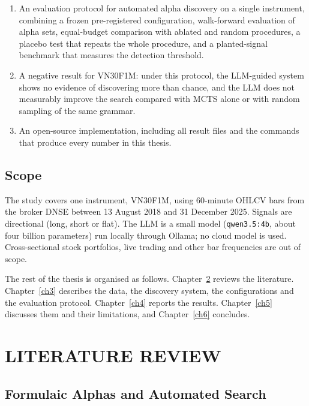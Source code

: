 \documentclass[12pt,a4paper,oneside]{book}
\theoremstyle{definition}
\newcommand{\code}[1]{\texttt{#1}}
\begin{document}
\begin{enumerate}
  \item An evaluation protocol for automated alpha discovery on a single instrument, combining a frozen pre-registered configuration, walk-forward evaluation of alpha sets, equal-budget comparison with ablated and random procedures, a placebo test that repeats the whole procedure, and a planted-signal benchmark that measures the detection threshold.
  \item A negative result for VN30F1M: under this protocol, the LLM-guided system shows no evidence of discovering more than chance, and the LLM does not measurably improve the search compared with MCTS alone or with random sampling of the same grammar.
  \item An open-source implementation, including all result files and the commands that produce every number in this thesis.
\end{enumerate}

\section{Scope}

The study covers one instrument, VN30F1M, using 60-minute OHLCV bars from the broker DNSE between 13 August 2018 and 31 December 2025. Signals are directional (long, short or flat). The LLM is a small model (\code{qwen3.5:4b}, about four billion parameters) run locally through Ollama; no cloud model is used. Cross-sectional stock portfolios, live trading and other bar frequencies are out of scope.

The rest of the thesis is organised as follows. Chapter~\ref{ch2} reviews the literature. Chapter~\ref{ch3} describes the data, the discovery system, the configurations and the evaluation protocol. Chapter~\ref{ch4} reports the results. Chapter~\ref{ch5} discusses them and their limitations, and Chapter~\ref{ch6} concludes.

\chapter{LITERATURE REVIEW}
\label{ch2}

\section{Formulaic Alphas and Automated Search}
\end{document}
